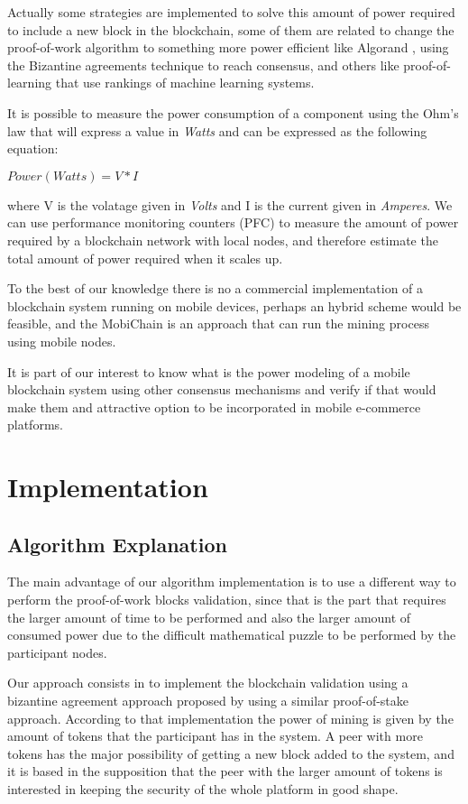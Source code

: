 \documentclass[journal]{IEEEtran}
\begin{document}
Actually some strategies are implemented to solve this amount of power required to include a new block 
in the blockchain, some of them are related to change the proof-of-work algorithm to something more power
 efficient like Algorand \cite{giladhemomicalivlachoszeldovich2017}, using the Bizantine agreements technique to reach consensus, and others like proof-of-learning \cite{bravo-marquezreevesugarte2019} that use rankings of machine learning systems.

It is possible to measure the power consumption of a component using the Ohm's law that will express a value in \emph{Watts} and can be expressed as the following equation: 
\begin{center}
    $Power(Watts) = V * I$
\end{center}
where V is the volatage given in \emph{Volts} and I is the current given in \emph{Amperes}. We can use performance monitoring counters (PFC) \cite{perfmonitoring:1991} to measure the amount of power required by a blockchain network with local nodes, and therefore estimate the total amount of power required when it scales up.

To the best of our knowledge there is no a commercial implementation of a blockchain system running on mobile devices, perhaps an hybrid scheme would be feasible, and the MobiChain \cite{Suankaewmanee} is an approach that can run the mining process using mobile nodes. 

It is part of our interest to know what is the power modeling of a mobile blockchain system using other consensus mechanisms and verify if that would make them and attractive  option to be incorporated in mobile e-commerce platforms.




\section{Implementation}

\subsection{Algorithm Explanation}
The main advantage of our algorithm implementation is to use a different way to perform the proof-of-work blocks validation, since that is the part that requires the larger amount of time to be performed and also the larger amount of consumed power due to the difficult mathematical puzzle to be performed by the participant nodes.

Our approach consists in to implement the blockchain validation using a bizantine agreement approach proposed by \cite{giladhemomicalivlachoszeldovich2017} using a similar proof-of-stake approach. According to that implementation the power of mining is given by the amount of tokens that the participant has in the system. A peer with more tokens has the major possibility of getting a new block added to the system, and it is based in the supposition that the peer with the larger amount of tokens is interested in keeping the security of the whole platform in good shape.
\end{document}
